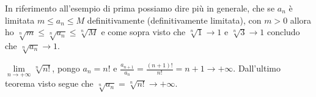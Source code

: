 \hspace{-15pt}In riferimento all'esempio di prima possiamo dire più in generale, che se $a_n$ è limitata $m \leq a_n \leq M$ definitivamente (definitivamente limitata), con $m > 0$ allora ho $\sqrt[n]{m} \leq \sqrt[n]{a_n} \leq \sqrt[n]{M}$ e come sopra visto che $\sqrt[n]{1} \to 1$ e $\sqrt[n]{3} \to 1$ concludo che $\sqrt[n]{a_n} \to 1$.

\begin{example}
$\lim\limits_{n\to +\infty}\sqrt[n]{n!}$, pongo $a_n = n!$ e $\frac{a_{n+1}}{a_n} = \frac{(n+1)!}{n!} = n+1 \to +\infty$. Dall'ultimo teorema visto segue che $\sqrt[n]{a_n} = \sqrt[n]{n!} \to +\infty$.
\end{example}